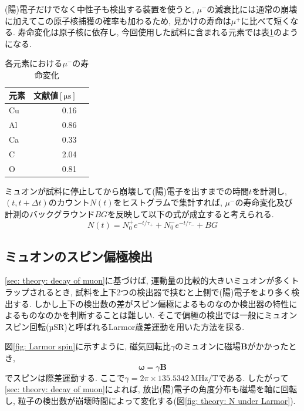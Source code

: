 \documentclass[dvipdfmx]{jsarticle}
\begin{document}
(陽)電子だけでなく中性子も検出する装置を使うと, $\mu^-$の減衰比には通常の崩壊に加えてこの原子核捕獲の確率も加わるため, 見かけの寿命は$\mu^+$に比べて短くなる.
寿命変化は原子核に依存し, 今回使用した試料に含まれる元素では表\ref{table: theory: life of muon}のようになる\cite{Ito Kaji Tabata Yoshiwara}.

\begin{table}
    \centering
    \caption{各元素における$\mu^-$の寿命変化}
    \begin{tabular}{lrr}
        \toprule
        元素 & 文献値$[\unit{\micro\second}]$
        \\
        \midrule
        Cu & 0.16
        \\
        Al & 0.86
        \\
        Ca & 0.33
        \\
        C & 2.04
        \\
        O & 0.81
        \\
        \bottomrule
    \end{tabular}
    \label{table: theory: life of muon}
\end{table}


ミュオンが試料に停止してから崩壊して(陽)電子を出すまでの時間$t$を計測し, $(t,t+\Delta t)$のカウント$N(t)$をヒストグラムで集計すれば, $\mu^-$の寿命変化及び計測のバックグラウンド$BG$を反映して以下の式が成立すると考えられる.
\begin{equation}
    \label{eq: N of t considering different tau and BG}
    N(t)
    =
    N_0^+e^{-t/\tau_+}
    +
    N_0^-e^{-t/\tau_-}
    +
    BG
\end{equation}


\subsection{ミュオンのスピン偏極検出}

\ref{sec: theory: decay of muon}に基づけば, 運動量の比較的大きいミュオンが多くトラップされるとき, 試料を上下2つの検出器で挟むと上側で(陽)電子をより多く検出する.
しかし上下の検出数の差がスピン偏極によるものなのか検出器の特性によるものなのかを判断することは難しい.
そこで偏極の検出では一般にミュオンスピン回転(µSR)と呼ばれるLarmor歳差運動を用いた方法を採る.

図\ref{fig: Larmor spin}に示すように, 磁気回転比$\gamma$のミュオンに磁場$\bm{B}$がかかったとき,
\begin{equation}
    \label{eq: Larmor precession}
    \bm{\omega}=\gamma\bm{B}
\end{equation}
でスピンは際差運動する.
ここで$\gamma=2\pi\times\SI{135.5342}{\mega\hertz/\tesla}$である.
したがって\ref{sec: theory: decay of muon}によれば, 放出(陽)電子の角度分布も磁場を軸に回転し, 粒子の検出数が崩壊時間によって変化する(図\ref{fig: theory: N under Larmor}).
\end{document}
